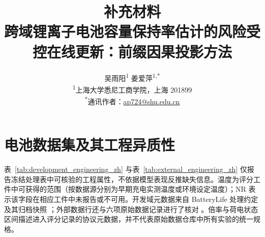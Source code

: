 \documentclass[UTF8,11pt]{ctexart}
\title{补充材料\\
\large 跨域锂离子电池容量保持率估计的风险受控在线更新：前缀因果投影方法}
\author{吴雨阳\textsuperscript{1} \quad 姜爱萍\textsuperscript{1,*}\\[0.35em]
\small\textsuperscript{1}上海大学悉尼工商学院，上海 201899\\
\small\textsuperscript{*}通讯作者：\href{mailto:ap724@shu.edu.cn}{ap724@shu.edu.cn}}
\date{}
\begin{document}
\maketitle
\renewcommand{\thetable}{S\arabic{table}}
\renewcommand{\thefigure}{S\arabic{figure}}

\section{电池数据集及其工程异质性}

表~\ref{tab:development_engineering_zh} 与表~\ref{tab:external_engineering_zh} 仅报告冻结处理表中可核验的工程属性，不依据模型表现反推缺失信息。温度为评分工件中可获得的范围（按数据源分别为早期充电实测温度或环境设定温度）；NR 表示该字段在相应工件中未报告或不可用。开发域元数据来自 BatteryLife 处理约定及其归档快照 \cite{tan2025batterylife,batterylife2026processed}；外部数据行还与六项原始数据记录进行了核对 \cite{wheeler2025lfp,kirkaldy2024comprehensive,luh2024dataset,li2024varyingusage,lam2025calendar,stroebl2024multistage}。倍率与荷电状态区间描述进入评分记录的协议元数据，并不代表原始数据仓库中所有实验的统一规格。
\end{document}
